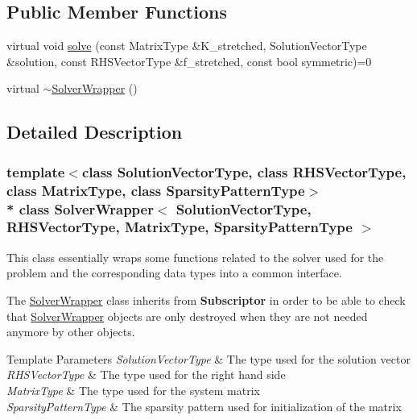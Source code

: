 \subsection*{Public Member Functions}
\begin{DoxyCompactItemize}
\item 
virtual void \hyperlink{class_solver_wrapper_a509594953f388e594bfdde5b927ece35}{solve} (const Matrix\+Type \&K\+\_\+stretched, Solution\+Vector\+Type \&solution, const R\+H\+S\+Vector\+Type \&f\+\_\+stretched, const bool symmetric)=0
\item 
virtual \hyperlink{class_solver_wrapper_a738e65e298fb0b13327e853fc9683b6d}{$\sim$\+Solver\+Wrapper} ()
\end{DoxyCompactItemize}


\subsection{Detailed Description}
\subsubsection*{template$<$class Solution\+Vector\+Type, class R\+H\+S\+Vector\+Type, class Matrix\+Type, class Sparsity\+Pattern\+Type$>$\\*
class Solver\+Wrapper$<$ Solution\+Vector\+Type, R\+H\+S\+Vector\+Type, Matrix\+Type, Sparsity\+Pattern\+Type $>$}

This class essentially wraps some functions related to the solver used for the problem and the corresponding data types into a common interface.

The \hyperlink{class_solver_wrapper}{Solver\+Wrapper} class inherits from {\bf Subscriptor} in order to be able to check that \hyperlink{class_solver_wrapper}{Solver\+Wrapper} objects are only destroyed when they are not needed anymore by other objects.


\begin{DoxyTemplParams}{Template Parameters}
{\em Solution\+Vector\+Type} & The type used for the solution vector\\
\hline
{\em R\+H\+S\+Vector\+Type} & The type used for the right hand side\\
\hline
{\em Matrix\+Type} & The type used for the system matrix\\
\hline
{\em Sparsity\+Pattern\+Type} & The sparsity pattern used for initialization of the matrix \\
\hline
\end{DoxyTemplParams}


